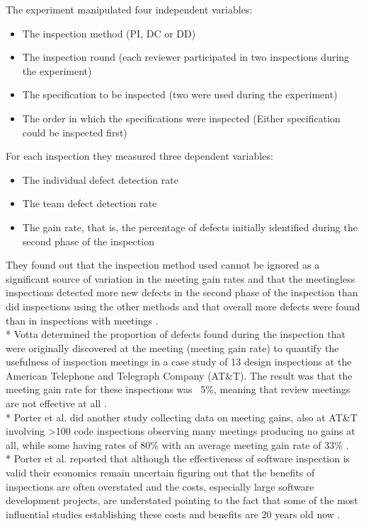 The experiment manipulated four independent variables:
\begin{itemize}
	\item The inspection method (PI, DC or DD)
	\item The inspection round (each reviewer participated in two inspections during the experiment)
	\item The specification to be inspected (two were used during the experiment)
	\item The order in which the specifications were inspected (Either specification could be inspected first)
\end{itemize}
For each inspection they measured three dependent variables:
\begin{itemize}
	\item The individual defect detection rate
	\item The team defect detection rate
	\item The gain rate, that is, the percentage of defects initially identified during the second phase of the inspection
\end{itemize}
They found out that the inspection method used cannot be ignored as a significant source of variation in the meeting gain rates and that the meetingless inspections detected more new defects in the second phase of the inspection than did inspections using the other methods and that overall more defects were found than in inspections with meetings \cite{mccarthy1996experiment}. \\*
Votta determined the proportion of defects found during the inspection that were originally discovered at the meeting (meeting gain rate) to quantify the usefulness of inspection meetings in a case study of 13 design inspections at the American Telephone and Telegraph Company (AT\&T). The result was that the meeting gain rate for these inspections was ~5\%, meaning that review meetings are not effective at all \cite{votta1993does}. \\*
Porter et al. did another study collecting data on meeting gains, also at AT\&T involving \textgreater 100 code inspections observing many meetings producing no gains at all, while some having rates of 80\% with an average meeting gain rate of 33\% \cite{porter1995experiment}. \\*
Porter et al. reported that although the effectiveness of software inspection is valid their economics remain uncertain figuring out that the benefits of inspections are often overstated and the costs, especially large software development projects, are understated pointing to the fact that some of the most influential studies establishing these costs and benefits are 20 years old now \cite{porter1996review}.
